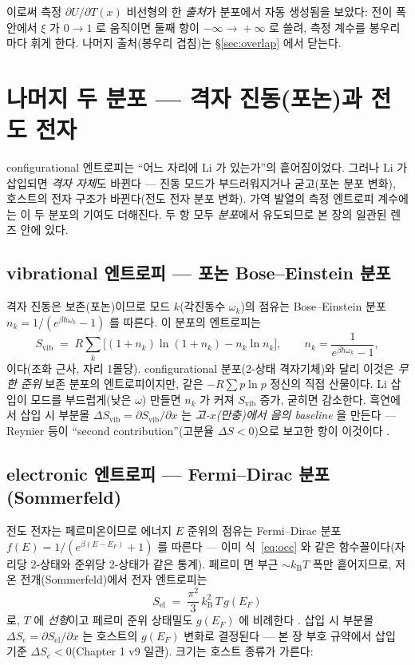\documentclass[11pt,a4paper]{article}
\newcommand{\vibr}{\mathrm{vib}}
\newcommand{\elec}{\mathrm{el}}
\newcommand{\kB}{k_{\mathrm{B}}}
\begin{document}
이로써 측정 $\partial U/\partial T(x)$ 비선형의 한 \emph{출처}가 분포에서 자동 생성됨을 보았다:
전이 폭 안에서 $\xi$ 가 $0\!\to\!1$ 로 움직이면 둘째 항이 $-\infty\!\to\!+\infty$ 로 쓸려, 측정
계수를 봉우리마다 휘게 한다. 나머지 출처(봉우리 겹침)는 \S\ref{sec:overlap} 에서 닫는다.

\section{나머지 두 분포 — 격자 진동(포논)과 전도 전자}\label{sec:vibel}
configurational 엔트로피는 ``어느 자리에 Li 가 있는가''의 흩어짐이었다. 그러나 Li 가 삽입되면 \emph{격자
자체}도 바뀐다 — 진동 모드가 부드러워지거나 굳고(포논 분포 변화), 호스트의 전자 구조가 바뀐다(전도 전자
분포 변화). 가역 발열의 측정 엔트로피 계수에는 이 두 분포의 기여도 더해진다. 두 항 모두 \emph{분포}에서
유도되므로 본 장의 일관된 렌즈 안에 있다.

\subsection{vibrational 엔트로피 — 포논 Bose--Einstein 분포}
격자 진동은 보존(포논)이므로 모드 $k$(각진동수 $\omega_k$)의 점유는 Bose--Einstein 분포
$n_k=1/(e^{\beta\hbar\omega_k}-1)$ 를 따른다. 이 분포의 엔트로피는
\begin{equation}
S_\vibr\;=\;R\sum_k\Big[(1+n_k)\ln(1+n_k)-n_k\ln n_k\Big],
\qquad n_k=\frac{1}{e^{\beta\hbar\omega_k}-1},
\label{eq:Svib}
\end{equation}
이다(조화 근사, 자리 1몰당). configurational 분포(2-상태 격자기체)와 달리 이것은 \emph{무한
준위} 보존 분포의 엔트로피이지만, 같은 $-R\sum p\ln p$ 정신의 직접 산물이다. Li 삽입이 모드를
부드럽게(낮은 $\omega$) 만들면 $n_k$ 가 커져 $S_\vibr$ 증가, 굳히면 감소한다. 흑연에서 삽입 시
부분몰 $\Delta S_\vibr=\partial S_\vibr/\partial x$ 는 \emph{고-$x$(만충)에서 음의 baseline} 을 만든다 —
Reynier 등이 ``second contribution''(고분율 $\Delta S<0$)으로 보고한 항이 이것이다 \cite{reynier2003}.

\subsection{electronic 엔트로피 — Fermi--Dirac 분포(Sommerfeld)}
전도 전자는 페르미온이므로 에너지 $E$ 준위의 점유는 Fermi--Dirac 분포
$f(E)=1/(e^{\beta(E-E_F)}+1)$ 를 따른다 — 이미 식~\eqref{eq:occ} 와 같은 함수꼴이다(자리당 2-상태와
준위당 2-상태가 같은 통계). 페르미 면 부근 $\sim\kB T$ 폭만 흩어지므로, 저온 전개(Sommerfeld)에서
전자 엔트로피는
\begin{equation}
\boxed{\;S_\elec\;=\;\frac{\pi^2}{3}\,\kB^2\,T\,g(E_F)\;}
\label{eq:Sel}
\end{equation}
로, $T$ 에 \emph{선형}이고 페르미 준위 상태밀도 $g(E_F)$ 에 비례한다 \cite{ashcroftmermin}. 삽입 시 부분몰
$\Delta S_e=\partial S_\elec/\partial x$ 는 호스트의 $g(E_F)$ 변화로 결정된다 — 본 장 부호 규약에서
삽입 기준 $\Delta S_e<0$(Chapter 1 v9 일관). 크기는 호스트 종류가 가른다:
\end{document}
